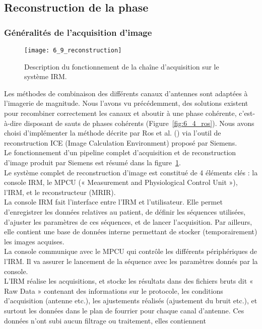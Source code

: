 {\subsection{Reconstruction de la phase}
\subsubsection{Généralités de l’acquisition d’image}
\begin{figure}[!t]
\centering
\texttt{[image: 6\_9\_reconstruction]}
\caption{Description du fonctionnement de la cha\^ine d'acquisition sur le système IRM.}
\label{fig:6_9_reconstruction}	
\end{figure}
Les méthodes de combinaison des différents canaux d’antennes sont adaptées à l’imagerie de
magnitude. Nous l’avons vu précédemment, des solutions existent pour recombiner correctement les
canaux et aboutir à une phase cohérente, c’est-à-dire disposant de sauts de phases cohérents (Figure~\ref{fig:6_4_ros}). Nous avons choisi d’implémenter la méthode décrite par Ros et al. (\cite{Ros2009}) via l’outil de
reconstruction ICE (Image Calculation Environment) proposé par Siemens.\\
Le fonctionnement d’un pipeline complet d’acquisition et de reconstruction d’image produit
par Siemens est résumé dans la figure~\ref{fig:6_9_reconstruction}.\\
Le système complet de reconstruction d’image est constitué de 4 éléments clés : la console
IRM, le MPCU (« Measurement and Physiological Control Unit »), l’IRM, et le reconstructeur (MRIR).\\
La console IRM fait l’interface entre l’IRM et l’utilisateur. Elle permet d’enregistrer les données
relatives au patient, de définir les séquences utilisées, d’ajuster les paramètres de ces séquences, et
de lancer l’acquisition. Par ailleurs, elle contient une base de données interne permettant de stocker
(temporairement) les images acquises.\\
La console communique avec le MPCU qui contrôle les différents périphériques de l’IRM. Il va
assurer le lancement de la séquence avec les paramètres donnés par la console.\\
L’IRM réalise les acquisitions, et stocke les résultats dans des fichiers bruts dit « Raw Data »
contenant des informations sur le protocole, les conditions d’acquisition (antenne etc.), les
ajustements réalisés (ajustement du bruit etc.), et surtout les données dans le plan de fourrier pour
chaque canal d’antenne. Ces données n’ont subi aucun filtrage ou traitement, elles contiennent
}
